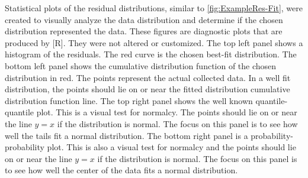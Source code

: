 \begin{linenumbers}
Statistical plots of the residual distributions, similar to \ref{fig:ExampleRes-Fit}, were created to visually analyze the data distribution and determine if the chosen distribution represented the data.  These figures are diagnostic plots that are produced by [R].  They were not altered or customized.  The top left panel shows a histogram of the residuals.  The red curve is the chosen best-fit distribution.  The bottom left panel shows the cumulative distribution function of the chosen distribution in red.  The points represent the actual collected data.  In a well fit distribution, the points should lie on or near the fitted distribution cumulative distribution function line.  The top right panel shows the well known quantile-quantile plot.  This is a visual test for normalcy.  The points should lie on or near the line $y=x$ if the distribution is normal.  The focus on this panel is to see how well the tails fit a normal distribution.  The bottom right panel is a probability-probability plot.  This is also a visual test for normalcy and the points should lie on or near the line $y=x$ if the distribution is normal.  The focus on this panel is to see how well the center of the data fits a normal distribution.


\end{linenumbers}
